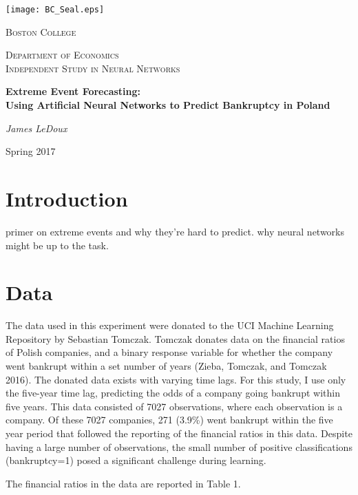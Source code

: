 \documentclass[12pt]{article}  %
\theoremstyle{definition}
\theoremstyle{remark}
\begin{document}
	\begin{titlepage}
		\centering
		\texttt{[image: BC\_Seal.eps]}\par\vspace{1cm}
		{\scshape\huge Boston College \par}
		\vspace{1cm}
		{\scshape\Large Department of Economics\\
		Independent Study in Neural Networks\par}
		\vspace{1.5cm}
		{\huge\bfseries Extreme Event Forecasting:\\ Using Artificial Neural Networks to Predict Bankruptcy in Poland\par}
		\vspace{2cm}
		{\Large\itshape
		James LeDoux}
		\vfill

		{\large Spring 2017\par}
	\end{titlepage}

\section{Introduction}
primer on extreme events and why they're hard to predict. why neural networks might be up to the task. 

\section{Data}
\par The data used in this experiment were donated to the UCI Machine Learning Repository by Sebastian Tomczak. Tomczak donates data on the financial ratios of Polish companies, and a binary response variable for whether the company went bankrupt within a set number of years (Zieba, Tomczak, and Tomczak 2016). The donated data exists with varying time lags. For this study, I use only the five-year time lag, predicting the odds of a company going bankrupt within five years. This data consisted of 7027 observations, where each observation is a company. Of these 7027 companies, 271 (3.9\%) went bankrupt within the five year period that followed the reporting of the financial ratios in this data. Despite having a large number of observations, the small number of positive classifications (bankruptcy=1) posed a significant challenge during learning. 

\par The financial ratios in the data are reported in Table 1.  
\end{document}
